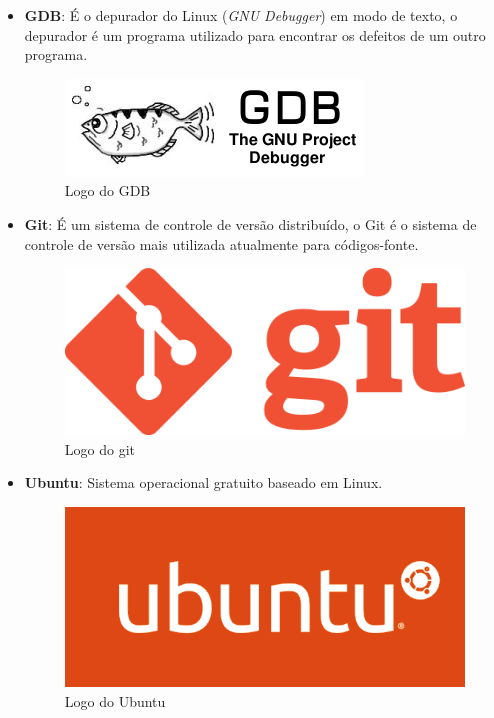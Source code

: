 \documentclass[11pt]{article} %
\begin{document}
\begin{itemize}
\item \textbf{GDB}: É o depurador do Linux (\textit{GNU Debugger}) em modo de texto, o depurador é um programa utilizado para encontrar os defeitos de um outro programa.

\begin{figure}[!htp]
\centering
\includegraphics[scale=0.3]{pictures/GDB.png}
\caption{Logo do GDB}
\label{Logo do GDB}
\end{figure}

\item \textbf{Git}: É um sistema de controle de versão distribuído, o Git é o sistema de controle de versão mais utilizada atualmente para códigos-fonte.
\begin{figure}[!htp]
\centering
\includegraphics[scale=0.1]{pictures/git.png}
\caption{Logo do git}
\label{Logo do git}
\end{figure}

\item \textbf{Ubuntu}: Sistema operacional gratuito baseado em Linux.

\begin{figure}[!htp]
\centering
\includegraphics[scale=0.2]{pictures/ubuntu.png}
\caption{Logo do Ubuntu}
\label{Logo do Ubuntu}
\end{figure}


\end{itemize}
\end{document}
